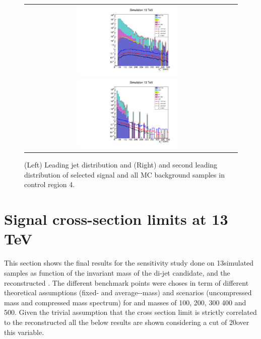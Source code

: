 \begin{figure}[tbh!]
	\centering
	\begin{tabular}{cc}
		\includegraphics[width=0.5\textwidth]{analysis/pics/h_jet1pt_Tau2LooseIsoInclusiveVBFInverted.pdf}
		\includegraphics[width=0.5\textwidth]{analysis/pics/h_tau2pt_Tau2LooseIsoInclusiveVBFInverted.pdf}
	\end{tabular}
	\caption{(Left) Leading jet \pt distribution and (Right) and second leading \hadtau \pt distribution of selected signal and all MC background samples in control region 4.}
	\label{fig::crplots2_Tau2LooseIsoInclusiveVBFInverted_13tev}
\end{figure}

\clearpage

\section{Signal cross-section limits at 13 TeV}
\label{sec::xseclim_results}

This section shows the final results for the sensitivity study done on 13\tev simulated samples as function of the invariant mass of the di-jet candidate,  \met and the reconstructed \hadtau \pt. The different benchmark points were choses in term of different theoretical assumptions (fixed- and average-\stau-mass) and scenarios (uncompressed mass and compressed mass spectrum) for \charginopm and \neutralinoone masses of 100, 200, 300 400 and 500\gev. Given the trivial assumption that the cross section limit is strictly correlated to the reconstructed \hadtau \pt all the below results are shown considering a cut of 20\gev over this variable.

